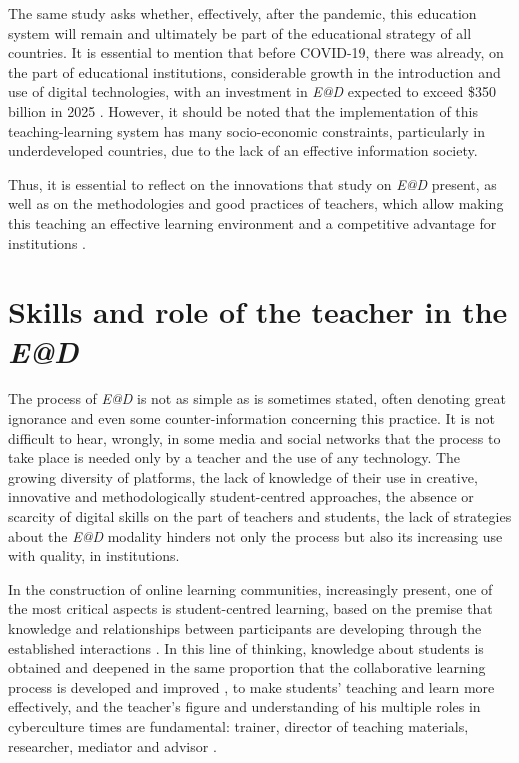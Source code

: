 \documentclass{textolivre}
\begin{document}
The same study asks whether, effectively, after the pandemic, this education system will remain and ultimately be part of the educational strategy of all countries. It is essential to mention that before COVID-19, there was already, on the part of educational institutions, considerable growth in the introduction and use of digital technologies, with an investment in \emph{E@D} expected to exceed \$350 billion in 2025 \cite{li2020}. However, it should be noted that the implementation of this teaching-learning system has many socio-economic constraints, particularly in underdeveloped countries, due to the lack of an effective information society.

Thus, it is essential to reflect on the innovations that study on \emph{E@D} present, as well as on the methodologies and good practices of teachers, which allow making this teaching an effective learning environment and a competitive advantage for institutions \cite{mcgill2014, ilin2017}.

\section{Skills and role of the teacher in the \emph{E@D}}
The process of \emph{E@D} is not as simple as is sometimes stated, often denoting great ignorance and even some counter-information concerning this practice. It is not difficult to hear, wrongly, in some media and social networks that the process to take place is needed only by a teacher and the use of any technology. The growing diversity of platforms, the lack of knowledge of their use in creative, innovative and methodologically student-centred approaches, the absence or scarcity of digital skills on the part of teachers and students, the lack of strategies about the \emph{E@D} modality hinders not only the process but also its increasing use with quality, in institutions.

In the construction of online learning communities, increasingly present, one of the most critical aspects is student-centred learning, based on the premise that knowledge and relationships between participants are developing through the established interactions \cite{martinho2014}. In this line of thinking, knowledge about students is obtained and deepened in the same proportion that the collaborative learning process is developed and improved \cite{anderson2008, garrison2008, palloff2007}, to make students' teaching and learn more effectively, and the teacher's figure and understanding of his multiple roles in cyberculture times are fundamental: trainer, director of teaching materials, researcher, mediator and advisor \cite{bruno2010}.
\end{document}
